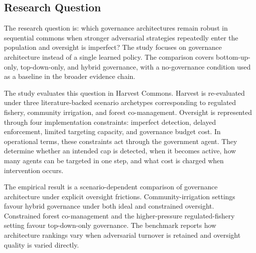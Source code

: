 \subsection{Research Question}

The research question is: which governance architectures remain robust in sequential commons when stronger adversarial strategies repeatedly enter the population and oversight is imperfect? The study focuses on governance architecture instead of a single learned policy. The comparison covers bottom-up-only, top-down-only, and hybrid governance, with a no-governance condition used as a baseline in the broader evidence chain.

The study evaluates this question in Harvest Commons. Harvest is re-evaluated under three literature-backed scenario archetypes corresponding to regulated fishery, community irrigation, and forest co-management. Oversight is represented through four implementation constraints: imperfect detection, delayed enforcement, limited targeting capacity, and governance budget cost. In operational terms, these constraints act through the government agent. They determine whether an intended cap is detected, when it becomes active, how many agents can be targeted in one step, and what cost is charged when intervention occurs.

The empirical result is a scenario-dependent comparison of governance architecture under explicit oversight frictions. Community-irrigation settings favour hybrid governance under both ideal and constrained oversight. Constrained forest co-management and the higher-pressure regulated-fishery setting favour top-down-only governance. The benchmark reports how architecture rankings vary when adversarial turnover is retained and oversight quality is varied directly.
